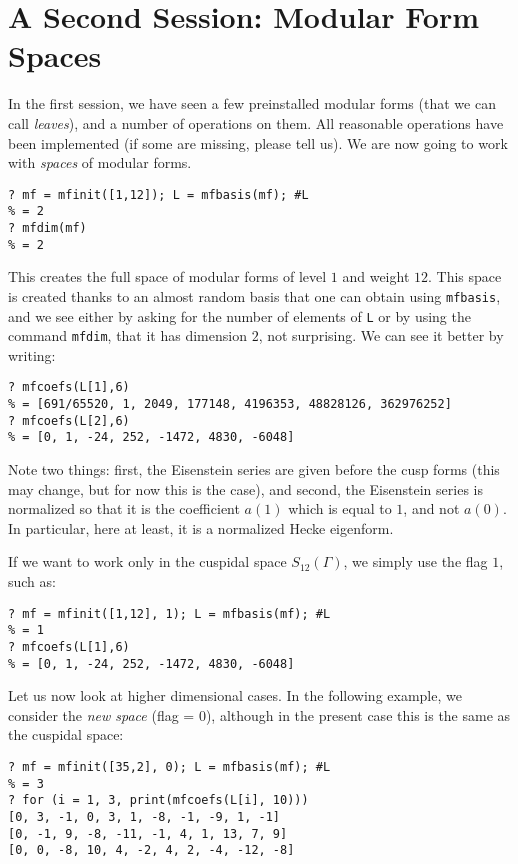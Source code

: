 \documentclass[11pt]{article}
\newcommand{\G}{\Gamma}
\def\kbd#1{{\tt #1}}
\begin{document}
\section{A Second Session: Modular Form Spaces}

In the first session, we have seen a few preinstalled modular forms (that
we can call \emph{leaves}), and a number of operations on them. All reasonable
operations have been implemented (if some are missing, please tell us). We are
now going to work with \emph{spaces} of modular forms.

\begin{verbatim}
? mf = mfinit([1,12]); L = mfbasis(mf); #L
% = 2
? mfdim(mf)
% = 2
\end{verbatim}

This creates the full space of modular forms of level $1$ and weight $12$.
This space is created thanks to an almost random basis that one can obtain
using \kbd{mfbasis}, and we see either by asking for the number of elements
of \kbd{L} or by using the command \kbd{mfdim}, that it has dimension $2$,
not surprising. We can see it better by writing:

\begin{verbatim}
? mfcoefs(L[1],6)
% = [691/65520, 1, 2049, 177148, 4196353, 48828126, 362976252]
? mfcoefs(L[2],6)
% = [0, 1, -24, 252, -1472, 4830, -6048]
\end{verbatim}

Note two things: first, the Eisenstein series are given before the cusp forms
(this may change, but for now this is the case), and second, the Eisenstein
series is normalized so that it is the coefficient $a(1)$ which is equal to
$1$, and not $a(0)$. In particular, here at least, it is a normalized
Hecke eigenform.

If we want to work only in the cuspidal space $S_{12}(\G)$, we simply use
the flag $1$, such as:

\begin{verbatim}
? mf = mfinit([1,12], 1); L = mfbasis(mf); #L
% = 1
? mfcoefs(L[1],6)
% = [0, 1, -24, 252, -1472, 4830, -6048]
\end{verbatim}

Let us now look at higher dimensional cases. In the following example, we
consider the \emph{new space} (flag = $0$), although in the present case
this is the same as the cuspidal space:

\begin{verbatim}
? mf = mfinit([35,2], 0); L = mfbasis(mf); #L
% = 3
? for (i = 1, 3, print(mfcoefs(L[i], 10)))
[0, 3, -1, 0, 3, 1, -8, -1, -9, 1, -1]
[0, -1, 9, -8, -11, -1, 4, 1, 13, 7, 9]
[0, 0, -8, 10, 4, -2, 4, 2, -4, -12, -8]
\end{verbatim}
\end{document}
